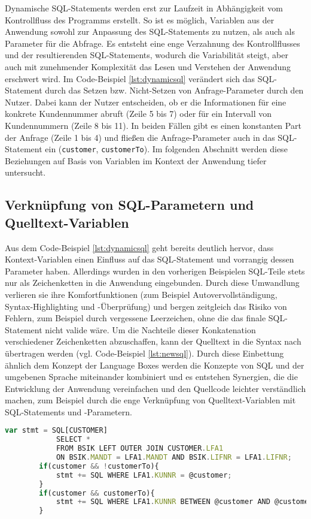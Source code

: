 Dynamische SQL-Statements werden erst zur Laufzeit in Abhängigkeit vom Kontrollfluss des Programms erstellt.
So ist es möglich, Variablen aus der Anwendung sowohl zur Anpassung des SQL-Statements zu nutzen, als auch als Parameter für die Abfrage.
Es entsteht eine enge Verzahnung des Kontrollflusses und der resultierenden SQL-Statements, wodurch die Variabilität steigt, aber auch mit zunehmender Komplexität das Lesen und Verstehen der Anwendung erschwert wird.
Im Code-Beispiel \ref{lst:dynamicsql} verändert sich das SQL-Statement durch das Setzen bzw. Nicht-Setzen von Anfrage-Parameter durch den Nutzer.
Dabei kann der Nutzer entscheiden, ob er die Informationen für eine konkrete Kundennummer abruft (Zeile 5 bis 7) oder für ein Intervall von Kundennummern (Zeile 8 bis 11).
In beiden Fällen gibt es einen konstanten Part der Anfrage (Zeile 1 bis 4) und fließen die Anfrage-Parameter auch in das SQL-Statement ein (\texttt{customer}, \texttt{customerTo}).
Im folgenden Abschnitt werden diese Beziehungen auf Basis von Variablen im Kontext der Anwendung tiefer untersucht.


\subsection{Verkn{\"u}pfung von SQL-Parametern und Quelltext-Variablen}
Aus dem Code-Beispiel \ref{lst:dynamicsql} geht bereits deutlich hervor, dass Kontext-Variablen einen Einfluss auf das SQL-Statement und vorrangig dessen Parameter haben.
Allerdings wurden in den vorherigen Beispielen SQL-Teile stets nur als Zeichenketten in die Anwendung eingebunden.
Durch diese Umwandlung verlieren sie ihre Komfortfunktionen (zum Beispiel Autovervollständigung, Syntax-Highlighting und -Überprüfung) und bergen zeitgleich das Risiko von Fehlern, zum Beispiel durch vergessene Leerzeichen, ohne die das finale SQL-Statement nicht valide wäre.
Um die Nachteile dieser Konkatenation verschiedener Zeichenketten abzuschaffen, kann der Quelltext in die Syntax nach \cite{Horschig2014} übertragen werden (vgl. Code-Beispiel \ref{lst:newsql}).
Durch diese Einbettung ähnlich dem Konzept der Language Boxes \cite{diekmann2013parsing} werden die Konzepte von SQL und der umgebenen Sprache miteinander kombiniert und es entstehen Synergien, die die Entwicklung der Anwendung vereinfachen und den Quellcode leichter verständlich machen, zum Beispiel durch die enge Verknüpfung von Quelltext-Variablen mit SQL-Statements und -Parametern.

	\begin{lstlisting}[caption={Übertragung des Code-Beispiels \ref{lst:dynamicsql} in die Syntax nach \cite{Horschig2014}}, label={lst:newsql}, language=JavaScript]
		var stmt = SQL[CUSTOMER]
			SELECT *
			FROM BSIK LEFT OUTER JOIN CUSTOMER.LFA1
			ON BSIK.MANDT = LFA1.MANDT AND BSIK.LIFNR = LFA1.LIFNR;
		if(customer && !customerTo){
			stmt += SQL WHERE LFA1.KUNNR = @customer;
		}
		if(customer && customerTo){
			stmt += SQL WHERE LFA1.KUNNR BETWEEN @customer AND @customerTo;
		}
	\end{lstlisting}

